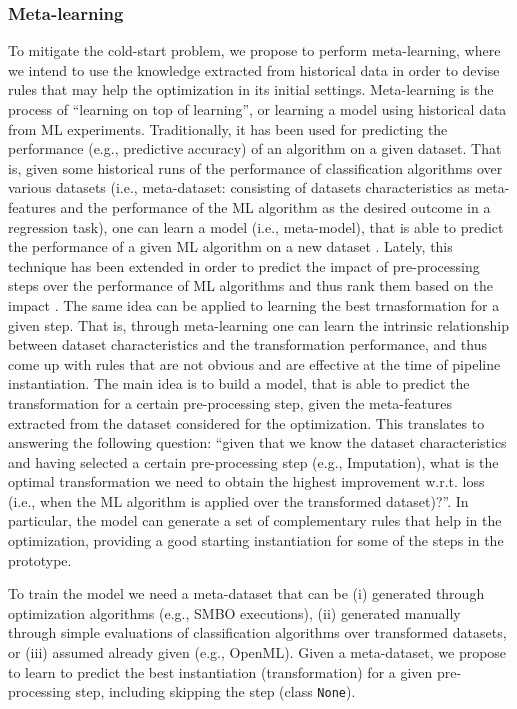 \subsubsection{Meta-learning}
To mitigate the cold-start problem, we propose to perform meta-learning, where we intend to use the knowledge extracted from historical data in order to devise rules that may help the optimization in its initial settings.
Meta-learning is the process of ``learning on top of learning'', or learning a model using historical data from ML experiments.
Traditionally, it has been used for predicting the performance (e.g., predictive accuracy) of an algorithm on a given dataset.
That is, given some historical runs of the performance of classification algorithms over various datasets (i.e., meta-dataset: consisting of datasets characteristics as meta-features and the performance of the ML algorithm as the desired outcome in a regression task), one can learn a model (i.e., meta-model), that is able to predict the performance of a given ML algorithm on a new dataset \cite{Brazdil04Book}.
Lately, this technique has been extended in order to predict the impact of pre-processing steps over the performance of ML algorithms and thus rank them based on the impact \cite{Bilalli17AMCS, presistant18CSI, presistant19DKE}.
The same idea can be applied to learning the best trnasformation for a given step.
That is, through meta-learning one can learn the intrinsic relationship between dataset characteristics and the transformation performance, and thus come up with rules that are not obvious and are effective at the time of pipeline instantiation.
The main idea is to build a model, that is able to predict the transformation for a certain pre-processing step, given the meta-features extracted from the dataset considered for the optimization.
This translates to answering the following question: ``given that we know the dataset characteristics and having selected a certain pre-processing step (e.g., Imputation), what is the optimal transformation we need to obtain the highest improvement w.r.t. loss (i.e., when the ML algorithm is applied over the transformed dataset)?''.
In particular, the model can generate a set of complementary rules that help in the optimization, providing a good starting instantiation for some of the steps in the prototype.

To train the model we need a meta-dataset that can be  (i) generated through optimization algorithms (e.g., SMBO executions), (ii) generated manually through simple evaluations of classification algorithms over transformed datasets, or (iii) assumed already given (e.g., OpenML).
Given a meta-dataset, we propose to learn to predict the best instantiation (transformation) for a given pre-processing step, including skipping the step (class \texttt{None}).

